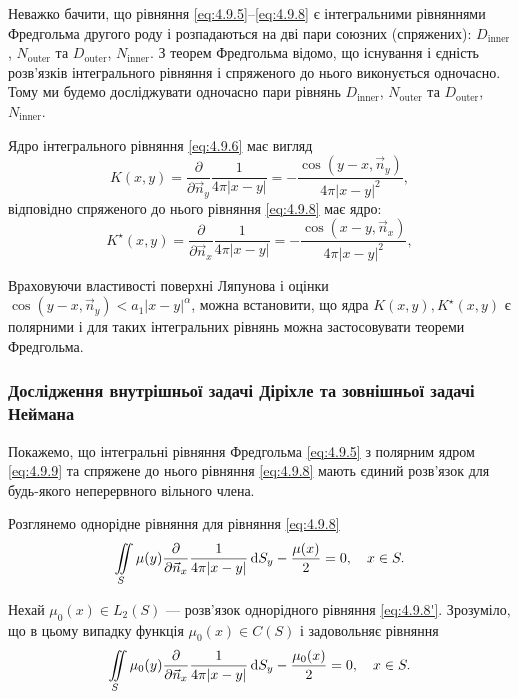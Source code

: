 Неважко бачити, що рівняння \eqref{eq:4.9.5}--\eqref{eq:4.9.8} є інтегральними рівняннями Фредгольма другого роду і розпадаються на дві пари союзних (спряжених): $D_{\text{inner}}$, $N_{\text{outer}}$ та $D_{\text{outer}}$, $N_{\text{inner}}$. З теорем Фредгольма відомо, що існування і єдність розв'язків інтегрального рівняння і спряженого до нього виконується одночасно. Тому ми будемо досліджувати одночасно пари рівнянь $D_{\text{inner}}$, $N_{\text{outer}}$ та $D_{\text{outer}}$, $N_{\text{inner}}$. \medskip

Ядро інтегрального рівняння \eqref{eq:4.9.6} має вигляд
\begin{equation}
	\label{eq:4.9.9}
	K(x, y) = \frac{\partial}{\partial \vec n_y} \frac{1}{4 \pi |x - y|} = - \frac{\cos(y - x, \vec n_y)}{4 \pi |x - y|^2},
\end{equation}
відповідно спряженого до нього рівняння \eqref{eq:4.9.8} має ядро:
\begin{equation}
	\label{eq:4.9.10}
	K^\star(x, y) = \frac{\partial}{\partial \vec n_x} \frac{1}{4 \pi |x - y|} = - \frac{\cos(x - y, \vec n_x)}{4 \pi |x - y|^2},
\end{equation}

Враховуючи властивості поверхні Ляпунова і оцінки $\cos(y - x, \vec n_y) < a_1 |x - y|^\alpha$, можна встановити, що ядра $K(x, y), K^\star(x, y)$ є полярними і для таких інтегральних рівнянь можна застосовувати теореми Фредгольма.

\subsubsection{Дослідження внутрішньої задачі Діріхле та зовнішньої задачі Неймана}

Покажемо, що інтегральні рівняння Фредгольма \eqref{eq:4.9.5} з полярним ядром \eqref{eq:4.9.9} та спряжене до нього рівняння \eqref{eq:4.9.8} мають єдиний розв'язок для будь-якого неперервного вільного члена. \medskip

Розглянемо однорідне рівняння для рівняння \eqref{eq:4.9.8} 
\begin{equation}
	\label{eq:4.9.8'}
	\displaystyle\iint\limits_S \mu(y) \frac{\partial}{\partial \vec n_x} \frac{1}{4 \pi |x - y|} \mathop{}\!\mathrm{d} S_y - \frac{\mu(x)}{2} = 0, \quad x \in S.
\end{equation}

Нехай $\mu_0(x) \in L_2(S)$ ---  розв'язок однорідного рівняння \eqref{eq:4.9.8'}. Зрозуміло, що в цьому випадку функція $\mu_0(x) \in C(S)$ і задовольняє рівняння
\begin{equation}
	\label{eq:4.9.8''}
	\displaystyle\iint\limits_S \mu_0(y) \frac{\partial}{\partial \vec n_x} \frac{1}{4 \pi |x - y|} \mathop{}\!\mathrm{d} S_y - \frac{\mu_0(x)}{2} = 0, \quad x \in S.
\end{equation}

